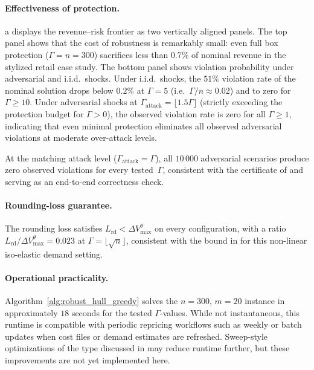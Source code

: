 \documentclass[11pt, a4paper]{article}
\theoremstyle{plain}
\theoremstyle{definition}
\theoremstyle{remark}
\begin{document}
\paragraph{Effectiveness of protection.}
a displays the revenue--risk frontier as two vertically aligned panels.
The top panel shows that the cost of robustness is remarkably small: even full box protection
($\Gamma=n=300$) sacrifices less than $0.7\%$ of nominal revenue in the stylized retail case study.
The bottom panel shows violation probability under adversarial and i.i.d.\ shocks.
Under i.i.d.\ shocks, the $51\%$ violation rate of the nominal solution drops below $0.2\%$
at $\Gamma=5$ (i.e.\ $\Gamma/n\approx 0.02$) and to zero for $\Gamma\ge 10$.
Under adversarial shocks at $\Gamma_{\mathrm{attack}}=\lfloor1.5\Gamma\rfloor$ (strictly
exceeding the protection budget for $\Gamma>0$), the observed violation rate is zero for all $\Gamma\ge 1$,
indicating that even minimal protection eliminates all observed adversarial violations at
moderate over-attack levels.

At the matching attack level ($\Gamma_{\mathrm{attack}}=\Gamma$), all $10\,000$ adversarial
scenarios produce zero observed violations for every tested~$\Gamma$, consistent with the certificate of
 and serving as an end-to-end correctness check.

\paragraph{Rounding-loss guarantee.}
The rounding loss satisfies $L_{\mathrm{rd}} < \Delta V_{\max}^\theta$ on every
configuration, with a ratio $L_{\mathrm{rd}}/\Delta V_{\max}^\theta = 0.023$ at
$\Gamma=\lfloor\sqrt{n}\rfloor$, consistent with the bound in
 for this non-linear iso-elastic demand setting.

\paragraph{Operational practicality.}
Algorithm~\ref{alg:robust_hull_greedy} solves the $n=300$, $m=20$ instance in approximately
$18$ seconds for the tested $\Gamma$-values. While not instantaneous, this runtime is compatible with periodic repricing workflows such as weekly or batch updates when cost files or demand estimates are refreshed. Sweep-style optimizations of the type discussed in  may reduce runtime further, but these improvements are not yet implemented here.
\end{document}
